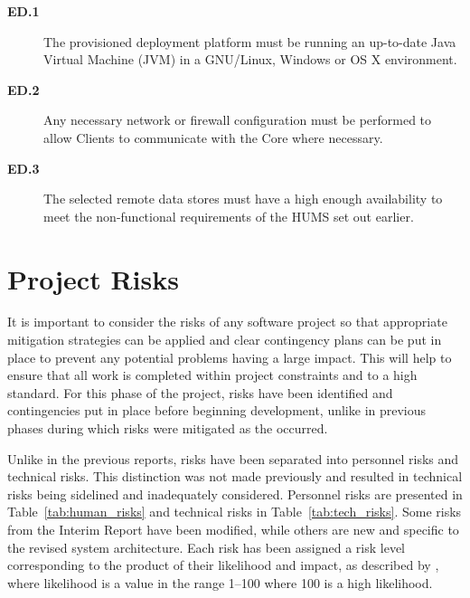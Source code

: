 \documentclass[10pt,a4paper]{article}
\newcommand{\ed}[1]{\textcolor{reqColor}{\textbf{ED.#1}}}
\begin{document}
 \begin{description}
 \item[\ed{1}] The provisioned deployment platform must be running an up-to-date Java Virtual Machine (JVM) in a GNU/Linux, Windows or OS X environment.
 \item[\ed{2}] Any necessary network or firewall configuration must be performed to allow Clients to communicate with the Core where necessary.
  \item[\ed{3}] The selected remote data stores must have a high enough availability to meet the non-functional requirements of the HUMS set out earlier.
 \end{description}

\section{Project Risks}
\label{sec:risks}
It is important to consider the risks of any software project so that appropriate mitigation strategies can be applied and clear contingency plans can be put in place to prevent any potential problems having a large impact. This will help to ensure that all work is completed within project constraints and to a high standard. For this phase of the project, risks have been identified and contingencies put in place before beginning development, unlike in previous phases during which risks were mitigated as the occurred.

Unlike in the previous reports, risks have been separated into personnel risks and technical risks. This distinction was not made previously and resulted in technical risks being sidelined and inadequately considered. Personnel risks are presented in Table~\ref{tab:human_risks} and technical risks in Table~\ref{tab:tech_risks}. Some risks from the Interim Report have been modified, while others are new and specific to the revised system architecture. Each risk has been assigned a risk level corresponding to the product of their likelihood and impact, as described by \cite{risks}, where likelihood is a value in the range 1--100 where 100 is a high likelihood.
\end{document}
